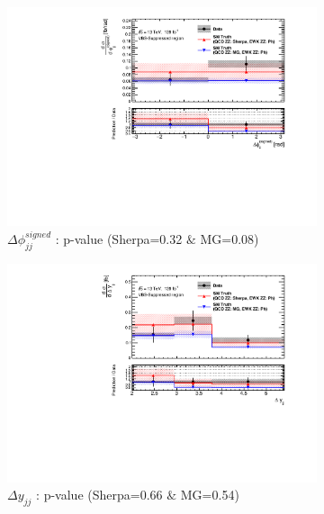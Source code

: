 \begin{figure}[!htb]
    \begin{subfigure}{.49\textwidth}
        \centering
        \includegraphics[width=.98\linewidth]{figures/Results/CrossSection_VBSSuppressed/xs_dphi_CR.pdf}
        \caption{ \footnotesize{$\Delta \phi _{jj}^{signed}$ }: p-value (Sherpa=0.32 $\&$ MG=0.08)}
    \end{subfigure}
    \begin{subfigure}{.49\textwidth}
        \centering
        \includegraphics[width=.98\linewidth]{figures/Results/CrossSection_VBSSuppressed/xs_dy_CR.pdf}
        \caption{ \footnotesize{$\Delta y_{jj}$ }: p-value (Sherpa=0.66 $\&$ MG=0.54)}
    \end{subfigure}\\
    \begin{subfigure}{.49\textwidth}
        \centering

\end{subfigure}
\end{figure}
